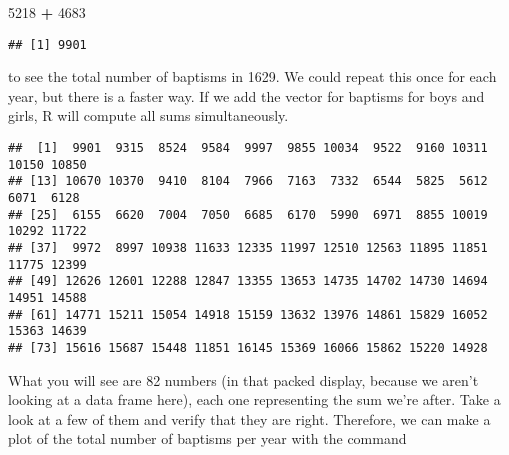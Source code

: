 \documentclass[
]{article}
\newenvironment{Shaded}{\begin{snugshade}}{\end{snugshade}}
\newcommand{\DataTypeTok}[1]{\textcolor[rgb]{0.13,0.29,0.53}{#1}}
\newcommand{\DecValTok}[1]{\textcolor[rgb]{0.00,0.00,0.81}{#1}}
\newcommand{\KeywordTok}[1]{\textcolor[rgb]{0.13,0.29,0.53}{\textbf{#1}}}
\newcommand{\NormalTok}[1]{#1}
\newcommand{\OperatorTok}[1]{\textcolor[rgb]{0.81,0.36,0.00}{\textbf{#1}}}
\newcommand{\StringTok}[1]{\textcolor[rgb]{0.31,0.60,0.02}{#1}}
\begin{document}
\begin{Shaded}
\begin{Highlighting}[]
\DecValTok{5218} \OperatorTok{+}\StringTok{ }\DecValTok{4683}
\end{Highlighting}
\end{Shaded}

\begin{verbatim}
## [1] 9901
\end{verbatim}

to see the total number of baptisms in 1629. We could repeat this once
for each year, but there is a faster way. If we add the vector for
baptisms for boys and girls, R will compute all sums simultaneously.

\begin{Shaded}
\end{Shaded}

\begin{verbatim}
##  [1]  9901  9315  8524  9584  9997  9855 10034  9522  9160 10311 10150 10850
## [13] 10670 10370  9410  8104  7966  7163  7332  6544  5825  5612  6071  6128
## [25]  6155  6620  7004  7050  6685  6170  5990  6971  8855 10019 10292 11722
## [37]  9972  8997 10938 11633 12335 11997 12510 12563 11895 11851 11775 12399
## [49] 12626 12601 12288 12847 13355 13653 14735 14702 14730 14694 14951 14588
## [61] 14771 15211 15054 14918 15159 13632 13976 14861 15829 16052 15363 14639
## [73] 15616 15687 15448 11851 16145 15369 16066 15862 15220 14928
\end{verbatim}

What you will see are 82 numbers (in that packed display, because we
aren't looking at a data frame here), each one representing the sum
we're after. Take a look at a few of them and verify that they are
right. Therefore, we can make a plot of the total number of baptisms per
year with the command

\begin{Shaded}
\end{Shaded}
\end{document}
